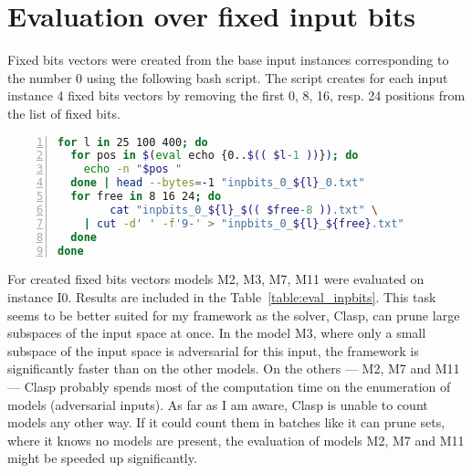 \documentclass[
    digital,
    color,
    oneside,
    sansbold,
    lot,
    nolof
]{fithesis}
\begin{document}
\section{Evaluation over fixed input bits}

Fixed bits vectors were created from the base input instances corresponding
to the number 0 using
the following bash script. The script creates for each input instance
4 fixed bits vectors by removing the first 0, 8, 16, resp. 24 positions from
the list of fixed bits.
\begin{lstlisting}[language=bash, numbers=left, countblanklines=false, escapeinside=``]
for l in 25 100 400; do
  for pos in $(eval echo {0..$(( $l-1 ))}); do
    echo -n "$pos "
  done | head --bytes=-1 "inpbits_0_${l}_0.txt"
  for free in 8 16 24; do
        cat "inpbits_0_${l}_$(( $free-8 )).txt" \
    | cut -d' ' -f'9-' > "inpbits_0_${l}_${free}.txt"
  done
done
\end{lstlisting}

For created fixed bits vectors models M2, M3, M7, M11 were evaluated on instance I0.
Results are included in the Table~\ref{table:eval_inpbits}.
This task seems to be better suited for my framework as the solver, Clasp, can prune
large subspaces of the input space at once. In the model M3, where only a small
subspace of the input space is adversarial for this input, the framework is
significantly faster than on the other models. On the others --- M2, M7 and M11 ---
Clasp probably spends most of the computation time on the enumeration
of models (adversarial inputs). As far as I am aware, Clasp is unable to count
models any other way. If it could count them in batches like it can prune
sets, where it knows no models are present, the evaluation of models M2, M7 and M11 might
be speeded up significantly.

\end{document}
